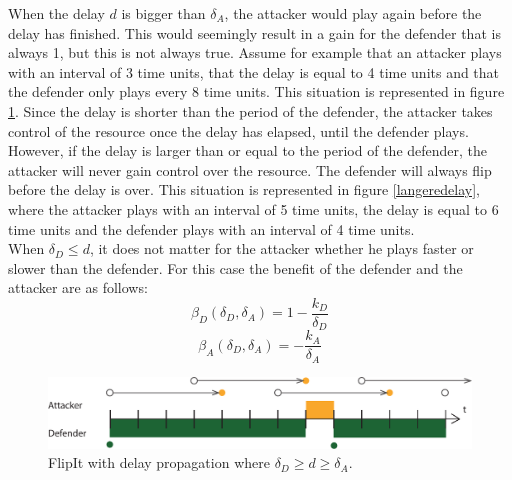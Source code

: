 When the delay $d$ is bigger than $\delta_{A}$, the attacker would play again before the delay has finished. This would seemingly result in a gain for the defender that is always 1, but this is not always true. Assume for example that an attacker plays with an interval of 3 time units, that the delay is equal to 4 time units and that the defender only plays every 8 time units. This situation is represented in figure \ref{langedelay}. Since the delay is shorter than the period of the defender, the attacker takes control of the resource once the delay has elapsed, until the defender plays.\\

However, if the delay is larger than or equal to the period of the defender, the attacker will never gain control over the resource. The defender will always flip before the delay is over. This situation is represented in figure \ref{langeredelay}, where the attacker plays with an interval of 5 time units, the delay is equal to 6 time units and the defender plays with an interval of 4 time units. \\
When $ \delta_{D} \leq d$, it does not matter for the attacker whether he plays faster or slower than the defender. For this case the benefit of the defender and the attacker are as follows:
\begin{equation}\label{case0def}
\beta_{D}(\delta_{D},\delta_{A})=1-\dfrac{k_{D}}{\delta_{D}}
\end{equation}
\begin{equation}\label{case0att}
\beta_{A}(\delta_{D},\delta_{A})=-\dfrac{k_{A}}{\delta_{A}}
\end{equation}




\begin{figure}[hbtp]
\centering
\includegraphics[scale=0.7]{Images/FlipItCase1delay.pdf} 
\caption{FlipIt with delay propagation where $\delta_{D} \geq d \geq \delta_{A}$.   }
\label{langedelay}
\end{figure}

